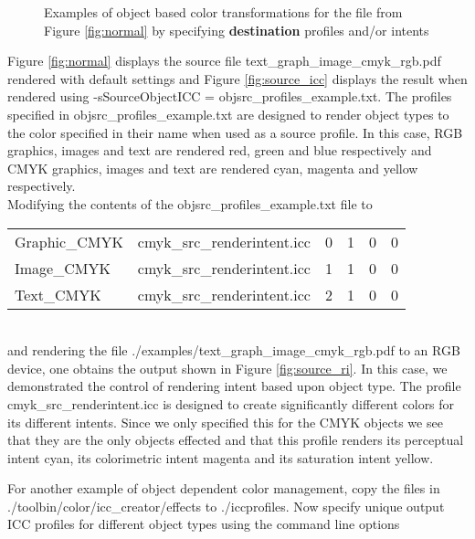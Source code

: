 \documentclass[12pt,notitlepage]{article}
\begin{document}
\begin{figure}
    \caption{Examples of object based color transformations for the file from Figure \ref{fig:normal} by specifying {\bf destination} profiles and/or intents}
  \label{fig:object_based_color}
\end{figure}

Figure \ref{fig:normal} displays the source file text\_graph\_image\_cmyk\_rgb.pdf rendered with default settings and Figure \ref{fig:source_icc} displays the result when rendered using  -sSourceObjectICC = objsrc\_profiles\_example.txt.   The profiles specified in objsrc\_profiles\_example.txt are designed to render object types to the color specified in their name when used as a source profile.  In this case, RGB graphics, images and text are rendered red, green and blue respectively and CMYK  graphics, images and text are rendered cyan, magenta and yellow respectively.\\

Modifying the contents of the objsrc\_profiles\_example.txt file to\\

\begin{tabular}{llllll}
Graphic\_CMYK & cmyk\_src\_renderintent.icc	& 0 & 1 & 0 & 0\\
Image\_CMYK	& cmyk\_src\_renderintent.icc	& 1 & 1 & 0 & 0 \\
Text\_CMYK	& cmyk\_src\_renderintent.icc	& 2 & 1 & 0 & 0 \\
\end{tabular}\\

\noindent and rendering the file ./examples/text\_graph\_image\_cmyk\_rgb.pdf to an RGB device, one obtains the output shown in Figure \ref{fig:source_ri}.  In this case, we demonstrated the control of rendering intent based upon object type.  The profile cmyk\_src\_renderintent.icc is designed to create significantly different colors for its different intents. Since we only specified this for the CMYK objects we see that they are the only objects effected and that this profile renders its perceptual intent cyan, its colorimetric intent magenta and its saturation intent yellow.

For another example of object dependent color management, copy the files in\\
./toolbin/color/icc\_creator/effects to ./iccprofiles.  Now specify unique output ICC profiles for different object types using the command line options\\
\end{document}
